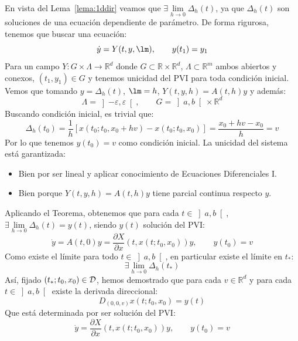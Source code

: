 \noindent
En vista del Lema~\ref{lema:1ddir} veamos que $\exists \lim\limits_{h\to0}\Delta_h(t)$, ya que $\Delta_h(t)$ son soluciones de una ecuación dependiente de parámetro. De forma rigurosa, tenemos que buscar una ecuación:
\begin{equation*}
    \dot{y} = Y(t,y,\lm), \qquad y(t_1) = y_1
\end{equation*}
Para un campo $Y:G\times \Lambda\to \mathbb{R}^d$ donde $G\subset \mathbb{R}\times \mathbb{R}^d$, $\Lambda\subset \mathbb{R}^m$ ambos abiertos y conexos, $(t_1,y_1)\in G$ y tenemos unicidad del PVI para toda condición inicial.\\

\noindent
Vemos que tomando $y = \Delta_h(t)$, $\lm = h$, $Y(t,y,h) = A(t,h)y$ y además:
\begin{equation*}
    \Lambda = \left]-\varepsilon,\varepsilon\right[, \qquad G = \left]a,b\right[\times \mathbb{R}^d
\end{equation*}
Buscando condición inicial, es trivial que:
\begin{equation*}
    \Delta_h(t_0) = \frac{1}{h}[x(t_0;t_0,x_0+hv)-x(t_0;t_0,x_0)] = \frac{x_0+hv-x_0}{h} = v
\end{equation*}
Por lo que tenemos $y(t_0) = v$ como condición inicial. La unicidad del sistema está garantizada:
\begin{itemize}
    \item Bien por ser lineal y aplicar conocimiento de Ecuaciones Diferenciales I.
    \item Bien porque $Y(t,y,h) = A(t,h)y$ tiene parcial continua respecto $y$.
\end{itemize}
Aplicando el Teorema, obtenemos que para cada $t\in \left]a,b\right[$, $\exists \lim\limits_{h\to0}\Delta_h(t) = y(t)$, siendo $y(t)$ solución del PVI:
\begin{equation*}
    \dot{y} = A(t,0)y = \frac{\partial X}{\partial x}(t,x(t;t_0,x_0))y, \qquad y(t_0) = v
\end{equation*}
Como existe el límite para todo $t\in \left]a,b\right[$, en particular existe el límite en $t_\ast$:
\begin{equation*}
    \exists \lim_{h\to0}\Delta_h(t_\ast)
\end{equation*}
Así, fijado $(t_\ast;t_0,x_0)\in \mathcal{D}$, hemos demostrado que para cada $v\in \mathbb{R}^d$ y para cada $t\in \left]a,b\right[$ existe la derivada direccional:
\begin{equation*}
    D_{(0,0,v)}x(t;t_0,x_0) = y(t)
\end{equation*}
Que está determinada por ser solución del PVI:
\begin{equation}\label{eq:dem_ddir}
    \dot{y} = \frac{\partial X}{\partial x}(t,x(t;t_0,x_0))y, \qquad y(t_0) = v
\end{equation}

